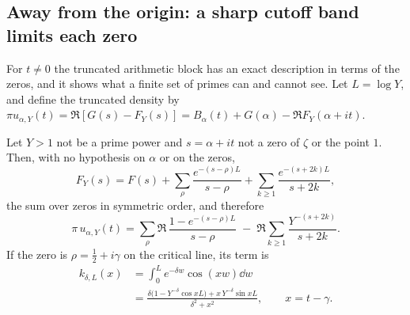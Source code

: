 \subsection{Away from the origin: a sharp cutoff band limits each zero}

For $t\ne0$ the truncated arithmetic block has an exact description in terms of the zeros, and it shows what a finite set of primes can and cannot see. Let $L=\log Y$, and define the truncated density by $\pi u_{\alpha,Y}(t)=\Re[G(s)-F_Y(s)]=B_\alpha(t)+G(\alpha)-\Re F_Y(\alpha+it)$.

\begin{theorem}\label{bo:thm:sharpcut}
Let $Y>1$ not be a prime power and $s=\alpha+it$ not a zero of $\zeta$ or the point $1$. Then, with no hypothesis on $\alpha$ or on the zeros,
\[
F_Y(s)=F(s)+\sum_\rho\frac{e^{-(s-\rho)L}}{s-\rho}+\sum_{k\ge1}\frac{e^{-(s+2k)L}}{s+2k},
\]
the sum over zeros in symmetric order, and therefore
\begin{equation}\label{bo:eq:sharp}
\pi\,u_{\alpha,Y}(t)=\sum_\rho\Re\,\frac{1-e^{-(s-\rho)L}}{s-\rho}\;-\;\Re\sum_{k\ge1}\frac{Y^{-(s+2k)}}{s+2k}.
\end{equation}
If the zero is $\rho=\frac12+i\gamma$ on the critical line, its term is
\begin{align*}
k_{\delta,L}(x)&=\int_0^{L}e^{-\delta w}\cos(xw)\dd w\\
&=\frac{\delta\bigl(1-Y^{-\delta}\cos xL\bigr)+x\,Y^{-\delta}\sin xL}{\delta^2+x^2},\qquad x=t-\gamma .
\end{align*}
\end{theorem}

